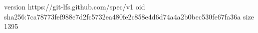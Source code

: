 version https://git-lfs.github.com/spec/v1
oid sha256:7ca78773fef988e7d2fc5732ea480fe2c858e4d6d74a4a2b0bec530fe67fa36a
size 1395
